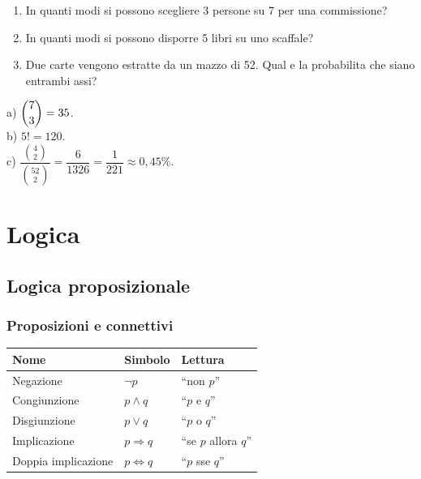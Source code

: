 \documentclass[12pt, a4paper, twoside, openright]{book}
\theoremstyle{definition}
\begin{document}
\begin{esercizio}
\begin{enumerate}[label=\alph*)]
  \item In quanti modi si possono scegliere 3 persone su 7 per una commissione?
  \item In quanti modi si possono disporre 5 libri su uno scaffale?
  \item Due carte vengono estratte da un mazzo di 52. Qual e la probabilita che siano entrambi assi?
\end{enumerate}
\end{esercizio}
\begin{soluzione}
a) $\dbinom{7}{3} = 35$.\\
b) $5! = 120$.\\
c) $\dfrac{\binom{4}{2}}{\binom{52}{2}} = \dfrac{6}{1326} = \dfrac{1}{221} \approx 0{,}45\%$.
\end{soluzione}

\part{Logica}

\chapter{Logica proposizionale}

\section{Proposizioni e connettivi}

\begin{defbox}
\begin{center}
\renewcommand{\arraystretch}{1.2}
\begin{tabular}{lll}
\toprule
\textbf{Nome} & \textbf{Simbolo} & \textbf{Lettura} \\
\midrule
Negazione & $\neg p$ & ``non $p$'' \\
Congiunzione & $p \land q$ & ``$p$ e $q$'' \\
Disgiunzione & $p \lor q$ & ``$p$ o $q$'' \\
Implicazione & $p \Rightarrow q$ & ``se $p$ allora $q$'' \\
Doppia implicazione & $p \Leftrightarrow q$ & ``$p$ sse $q$'' \\
\bottomrule
\end{tabular}
\end{center}
\end{defbox}
\end{document}
